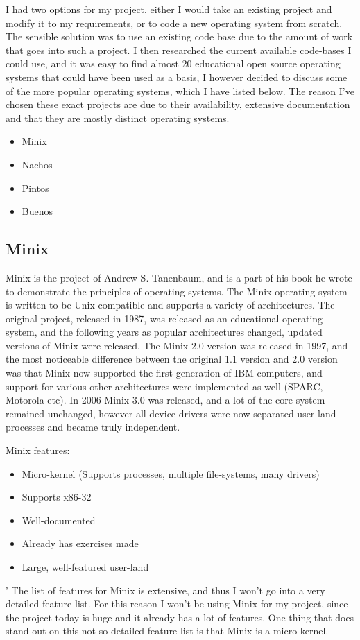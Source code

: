I had two options for my project, either I would take an existing project and modify it to my requirements, or to code a new operating system from scratch. The sensible solution was to use an existing code base due to the amount of work that goes into such a project. I then researched the current available code-bases I could use, and it was easy to find almost 20 educational open source operating systems that could have been used as a basis, I however decided to discuss some of the more popular operating systems, which I have listed below.
The reason I've chosen these exact projects are due to their availability, extensive documentation and that they are mostly distinct operating systems.

\begin{itemize}
  \item Minix
  \item Nachos
  \item Pintos
  \item Buenos
\end{itemize}

\subsection{Minix}

Minix is the project of Andrew S. Tanenbaum, and is a part of his book\cite{AndrewTanenbaum} he wrote to demonstrate the principles of operating systems. The Minix operating system is written to be Unix-compatible and supports a variety of architectures. The original project, released in 1987\cite{MinixRef1}, was released as an educational operating system, and the following years as popular architectures changed, updated versions of Minix were released. The Minix 2.0 version was released in 1997, and the most noticeable difference between the original 1.1 version and 2.0 version was that Minix now supported the first generation of IBM computers, and support for various other architectures were implemented as well (SPARC, Motorola etc). In 2006 Minix 3.0 was released, and a lot of the core system remained unchanged, however all device drivers were now separated user-land processes and became truly independent.

Minix features\cite{MinixRef}:

\begin{itemize}
  \item Micro-kernel (Supports processes, multiple file-systems, many drivers)
  \item Supports x86-32
  \item Well-documented
  \item Already has exercises made
  \item Large, well-featured user-land
\end{itemize}
'
The list of features for Minix is extensive, and thus I won't go into a very detailed feature-list. For this reason I won't be using Minix for my project, since the project today is huge and it already has a lot of features. One thing that does stand out on this not-so-detailed feature list is that Minix is a micro-kernel.

